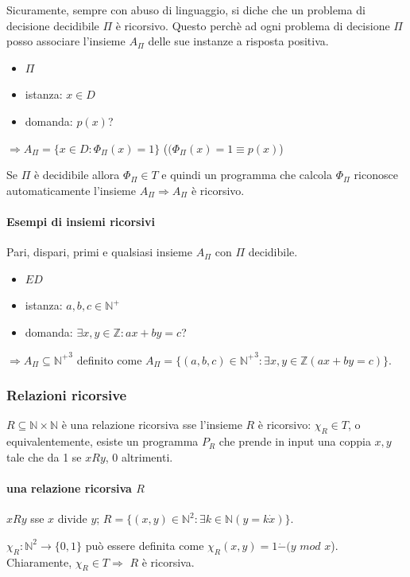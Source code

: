 \documentclass{article}
\begin{document}
Sicuramente, sempre con abuso di linguaggio, si diche che un problema di decisione decidibile $\Pi$ è ricorsivo. Questo perchè ad ogni problema di decisione $\Pi$ posso associare l'insieme $A_{\Pi}$ delle sue instanze a risposta positiva.
\begin{itemize}
	\item $\Pi$
	\item istanza: $x \in D$
	\item domanda: $p(x)$?
\end{itemize}
$\Rightarrow A_{\Pi}=\{ x \in D: \Phi_{\Pi}(x)=1 \}$ ($(\Phi_{\Pi}(x)=1 \equiv p(x)$)





Se $\Pi$ è decidibile allora $\Phi_{\Pi} \in T$ e quindi un programma che calcola $\Phi_{\Pi}$ riconosce automaticamente l'insieme $A_{\Pi} \Rightarrow A_{\Pi}$ è ricorsivo.
\paragraph{Esempi di insiemi ricorsivi}
Pari, dispari, primi e qualsiasi insieme $A_{\Pi}$ con $\Pi$ decidibile.
\begin{itemize}
	\item $ED$
	\item istanza: $a,b,c \in \mathbb{N}^+$
	\item domanda: $\exists x,y \in \mathbb{Z}:ax+by=c$?
\end{itemize}
$\Rightarrow A_{\Pi} \subseteq {\mathbb{N}^+}^3$ definito come $A_{\Pi}= \{ (a,b,c) \in {\mathbb{N}^+}^3: \exists x,y \in \mathbb{Z} (ax+by=c) \}$.


\subsubsection{Relazioni ricorsive}
$R \subseteq \mathbb{N}\times \mathbb{N}$ è una relazione ricorsiva sse l'insieme $R$ è ricorsivo: $\chi_R \in T$, o equivalentemente, esiste un programma $P_R$ che prende in input una coppia $x,y$ tale che da 1 se $xRy$, 0 altrimenti.
\paragraph{una relazione ricorsiva $R$} $xRy$ sse $x$ divide $y$; $R= \{ (x,y) \in \mathbb{N}^2: \exists k \in \mathbb{N}(y=k\dot x)\}$.



$\chi_R:\mathbb{N}^2 \rightarrow \{0,1\}$ può essere definita come $\chi_R(x,y)=1\dot{-}(y$ $mod$ $x$). Chiaramente, $\chi_R \in T \Rightarrow$ $R$ è ricorsiva.
\end{document}

